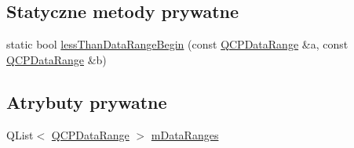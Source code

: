 \subsection*{Statyczne metody prywatne}
\begin{DoxyCompactItemize}
\item 
static bool \hyperlink{class_q_c_p_data_selection_a6f171526f5441482568ff5e22e6af2c6}{less\+Than\+Data\+Range\+Begin} (const \hyperlink{class_q_c_p_data_range}{Q\+C\+P\+Data\+Range} \&a, const \hyperlink{class_q_c_p_data_range}{Q\+C\+P\+Data\+Range} \&b)
\end{DoxyCompactItemize}
\subsection*{Atrybuty prywatne}
\begin{DoxyCompactItemize}
\item 
Q\+List$<$ \hyperlink{class_q_c_p_data_range}{Q\+C\+P\+Data\+Range} $>$ \hyperlink{class_q_c_p_data_selection_aa1070e7c700f15d9018fad78b4732004}{m\+Data\+Ranges}
\end{DoxyCompactItemize}
